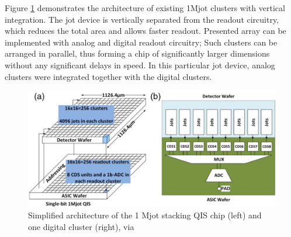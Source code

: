 Figure \ref{fig:qischip} demonstrates the architecture of existing 1Mjot clusters with vertical integration. The jot device is vertically separated from the readout circuitry, which reduces the total area and allows faster readout. Presented array can be implemented with analog and digital readout circuitry; Such clusters can be arranged in parallel, thus forming a chip of significantly larger dimensions without any significant delays in speed. In this particular jot device, analog clusters were integrated together with the digital clusters.



\begin{figure}[h]
  \centering
  \includegraphics[width=\linewidth]{imgs/qis/mjot-wafer.png}
  \caption{Simplified architecture of the 1 Mjot stacking QIS chip (left) and one digital cluster (right), via \cite{Ma:17}}
  \label{fig:qischip}
\end{figure}

